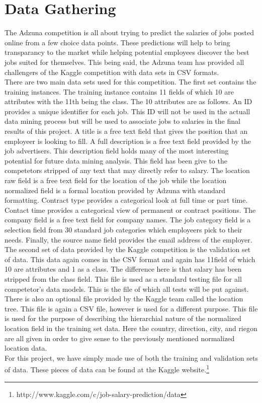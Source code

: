 \section{Data Gathering}

The Adzuna competition is all about trying to predict the salaries of jobs posted online from a few choice data
points. These predictions will help to bring transparancy to the market while helping potential employees discover
the best jobs suited for themselves. This being said, the Adzuna team has provided all challengers of the Kaggle
competition with data sets in CSV formats.\\

There are two main data sets used for this competition. The first set contains the training instances. The
training instance contains 11 fields of which 10 are attributes with the 11th being the class. The 10
attributes are as follows. An ID provides a unique identifier for each job. This ID will not be used in the
actuall data mining process but will be used to associate jobs to salaries in the final results of this project.
A title is a free text field that gives the position that an employeer is looking to fill. A full description
is a free text field provided by the job advertisers. This description field holds many of the most interesting
potential for future data mining analysis. This field has been give to the competetors stripped of any 
text that may directly refer to salary. The location raw field is a free text field for the location of
the job while the location normalized field is a formal location provided by Adzuna with standard formatting.
Contract type provides a categorical look at full time or part time. Contact time provides a categorical
view of permanent or contract positions. The company field is a free text field for company names. The 
job category field is a selection field from 30 standard job categories which employeers pick to their needs.
Finally, the source name field provides the email address of the employer.\\

The second set of data provided by the Kaggle competition is the validation set of data. This data
again comes in the CSV format and again has 11field of which 10 are attributes and 1 as a class. The
difference here is that salary has been stripped from the class field. This file is used as a standard
testing file for all competetor's data models. This is the file of which all tests will be put against.\\

There is also an optional file provided by the Kaggle team called the location tree. This file is 
again a CSV file, however is used for a different purpose. This file is used for the purpose of
describing the hierarchial nature of the normalized location field in the training set data. Here
the country, direction, city, and riegon are all given in order to give sense to the previously
mentioned normalized location data.\\

For this project, we have simply made use of both the training and validation sets of data. These pieces
of data can be found at the Kaggle website.\footnote{http://www.kaggle.com/c/job-salary-prediction/data}